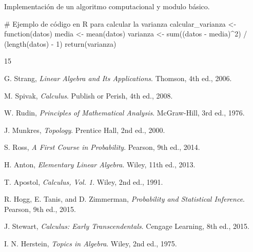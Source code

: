	Implementación de un \gls{algoritmo} computacional y \gls{modulo} básico.
	
	\begin{codigo}
# Ejemplo de código en R para calcular la varianza
calcular_varianza <- function(datos) {
	media <- mean(datos)
	varianza <- sum((datos - media)^2) / (length(datos) - 1)
	return(varianza)
}
	\end{codigo}
	
	
	\begin{thebibliography}{15}
		
		 G. Strang, \textit{Linear Algebra and Its Applications}. Thomson, 4th ed., 2006.
		
		 M. Spivak, \textit{Calculus}. Publish or Perish, 4th ed., 2008.
		
		 W. Rudin, \textit{Principles of Mathematical Analysis}. McGraw-Hill, 3rd ed., 1976.
		
		 J. Munkres, \textit{Topology}. Prentice Hall, 2nd ed., 2000.
		
		 S. Ross, \textit{A First Course in Probability}. Pearson, 9th ed., 2014.
		
		 H. Anton, \textit{Elementary Linear Algebra}. Wiley, 11th ed., 2013.
		
		 T. Apostol, \textit{Calculus, Vol. 1}. Wiley, 2nd ed., 1991.
		
		 R. Hogg, E. Tanis, and D. Zimmerman, \textit{Probability and Statistical Inference}. Pearson, 9th ed., 2015.
		
		 J. Stewart, \textit{Calculus: Early Transcendentals}. Cengage Learning, 8th ed., 2015.
		
		 I. N. Herstein, \textit{Topics in Algebra}. Wiley, 2nd ed., 1975.
	\end{thebibliography}
	
	\printglossaries
	
